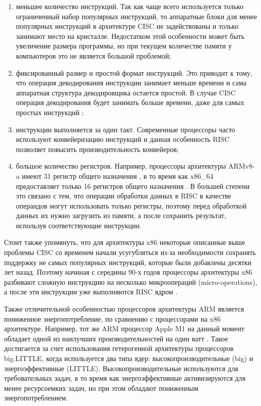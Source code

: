 \begin{enumerate}
\item меньшее количество инструкций. Так как чаще всего используется только ограниченный набор популярных инструкций, то 
аппаратные блоки для менее популярных инструкций в архитектуре CISC не задействованы и только занимают место на кристалле. 
Недостатком этой особенности может быть увеличение размера программы, но при текущем количестве памяти у компьютеров это 
не является большой проблемой;
\item фиксированный размер и простой формат инструкций. Это приводит к тому, что операция декодирования инструкции занимает 
меньше времени и сама аппаратная структура декодировщика остается простой. В случае CISC операция декодирования будет 
занимать больше времени, даже для самых простых инструкций \cite{DIGITAL_DESIGN};
\item инструкции выполняется за один такт. Современные процессоры часто используют конвейеризацию инструкций и данная 
особенность RISC позволяет повысить производительность конвейеров;  
\item большое количество регистров. Например, процессоры архитектуры ARMv8-a имеют 31 регистр общего назначения \cite{ARM_REF}, 
в то время как x86\_64 предоставляет только 16 регистров общего назначения \cite{INTEL_REF}. В большей степени это связано 
с тем, что операции обработки данных в RISC в качестве операндов могут использовать только регистры, поэтому перед 
обработкой данных их нужно загрузить из памяти, а после сохранить результат, используя соответствующие инструкции.
\end{enumerate}

Стоит также упомянуть, что для архитектуры x86 некоторые описанные выше проблемы CISC со временем начали усугубляться из-за
необходимости сохранять поддержку не самых популярных инструкций, которые были добавлены десятки лет назад. Поэтому начиная
с середины 90-х годов процессоры архитектуры x86 разбивают сложную инструкцию на несколько микроопераций (micro-operations),
а после эти инструкции уже выполняются RISC ядром \cite{DIGITAL_DESIGN}.

Также отличительной особенностью процессоров архитектуры ARM является пониженное энергопотребление, по сравнению с процессорами
на x86 архитектуре. Например, тот же ARM процессор Apple M1 на данный момент обладает одной из наилучших производительностей 
на один ватт \cite{APPLE_M1}. Такое достигается за счет использования гетерогенной архитектуры процессоров big.LITTLE, 
когда используется два типа ядер: высокопроизводительные (big) и энергоэффективные (LITTLE). Высокопроизводительные 
используются для требовательных задач, в то время как энергоэффективные активизируются для менее ресурсоемких задач, 
но при этом обладают пониженным энергопотреблением.

